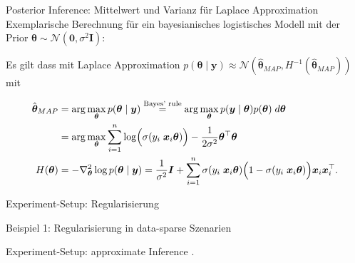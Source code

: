 \documentclass[
  ignorenonframetext,
  aspectratio=169,
]{beamer}
\newif\ifbibliography
\newcommand{\bnull}{\bm{0}}
\newcommand{\bx}{\bm{x}}
\newcommand{\by}{\bm{y}}
\newcommand{\bI}{\bm{I}}
\newcommand{\Ncal}{\mathcal{N}}
\newcommand{\ssd}{\sigma^2}
\newcommand{\btheta}{\bm{\theta}}
\newcommand{\hbtheta}{\hat{\bm{\theta}}}
\newcommand{\sumin}{\sum_{i = 1}^n}
\begin{document}
\begin{frame}{Posterior Inference: Mittelwert und Varianz für Laplace
Approximation}
\protect{}\label{posterior-inference-mittelwert-und-varianz-fuxfcr-laplace-approximation}
Exemplarische Berechnung für ein bayesianisches logistisches Modell mit
der Prior \(\btheta \sim \Ncal(\bnull, \ssd \bI)\):

Es gilt dass mit Laplace Approximation
\(p(\btheta \mid \by) \approx \Ncal(\hbtheta_{MAP}, H^{-1}(\hbtheta_{MAP}))\)
mit

\[
\begin{aligned}
    \hbtheta_{MAP} &= \arg \max_{\btheta} p(\btheta \mid \by)
        \overset{\text{Bayes' rule}}{=} \arg \max_{\btheta} p(\by \mid \btheta) p(\btheta) \; d\btheta  \\
        &= \arg \max_{\btheta} \sumin \log \Bigl( \sigma(y_i \; \bx_i\btheta)\Bigr) - \frac{1}{2 \ssd} \btheta^\top \btheta \\
    H(\btheta) &= - \nabla^2_{\btheta}  \log p (\btheta \mid \by) = \frac{1}{\ssd} \bI + \sumin
    \sigma(y_i \; \bx_i\btheta) \Bigl(1 - \sigma(y_i \; \bx_i\btheta)\Bigr)
        \bx_i \bx_i^\top.
\end{aligned}
\]
\end{frame}

\begin{frame}{Experiment-Setup: Regularisierung}
\protect{}\label{experiment-setup-regularisierung}
\end{frame}

\begin{frame}{Beispiel 1: Regularisierung in data-sparse Szenarien}
\protect{}\label{beispiel-1-regularisierung-in-data-sparse-szenarien}
\end{frame}

\begin{frame}{Experiment-Setup: approximate Inference}
\protect{}\label{experiment-setup-approximate-inference}
.
\end{frame}

\begin{frame}[allowframebreaks]{}
  \bibliographytrue
  \printbibliography[heading=none]
\end{frame}
\end{document}
